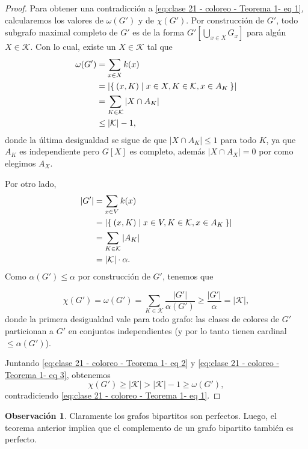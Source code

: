 \documentclass[12pt]{report}
\theoremstyle{plain}
\theoremstyle{definition}
\newtheorem{obs}[theorem]{Observación}
\newcommand{\abs}[1]{\left \vert #1 \right \vert}
\newcommand{\Kappa}{\mathcal{K}}
\begin{document}
\begin{proof}
Para obtener una contradicción a \eqref{eq:clase 21 - coloreo - Teorema 1- eq 1}, calcularemos los valores de $\omega (G')$ y de $\chi (G')$. Por construcción de $G'$, todo subgrafo maximal completo de $G'$ es de la forma $G'[\bigcup_{x \in X} G_x]$ para algún $X \in \Kappa$. Con lo cual, existe un $X \in \Kappa$ tal que
\begin{align}
\omega (G') &= \sum_{x \in X} k(x) \nonumber \\
            &= \abs{\Set{(x, K) |  x\in X, K \in \Kappa, x \in A_K}} \nonumber \\
            &= \sum_{K \in \Kappa} \abs{X \cap A_K} \nonumber \\
            &\leq \abs{\Kappa} -1 , \label{eq:clase 21 - coloreo - Teorema 1- eq 2}
\end{align}
donde la última desigualdad se sigue de que $\abs {X \cap A_K} \leq 1$ para todo $K$, ya que $A_K$ es independiente pero $G[X]$ es completo, además $\abs{X \cap A_X} = 0$ por como elegimos $A_X$.

Por otro lado,
\begin{align*}
\abs{G'} &= \sum_{x \in V} k(x) \\
        &= \abs{\Set{(x, K) | x \in V, K \in \Kappa, x \in A_K}} \\
        &= \sum_{K \in \Kappa} \abs{A_K} \\
        &= \abs{\Kappa} \cdot \alpha.
\end{align*}
Como $\alpha (G') \leq \alpha$ por construcción de $G'$, tenemos que

\begin{equation}\label{eq:clase 21 - coloreo - Teorema 1- eq 3}
\chi (G') = \omega (G') = \sum_{K \in \Kappa}  \frac{\abs{G'}}{\alpha (G')} \geq \frac{\abs {G'}}{\alpha} = \abs{\Kappa},
\end{equation}
donde la primera desigualdad vale para todo grafo: las clases de colores de $G'$ particionan a $G'$ en conjuntos independientes (y por lo tanto tienen cardinal $\leq \alpha (G')$).

Juntando \eqref{eq:clase 21 - coloreo - Teorema 1- eq 2} y \eqref{eq:clase 21 - coloreo - Teorema 1- eq 3}, obtenemos
\[
    \chi (G') \geq \abs{\Kappa} > \abs{\Kappa} - 1 \geq \omega (G'),
\]
contradiciendo \eqref{eq:clase 21 - coloreo - Teorema 1- eq 1}.
\end{proof}

\begin{obs}\label{obs:bipartitos son perfectos}
Claramente los grafos bipartitos son perfectos. Luego, el teorema anterior implica que el complemento de un grafo bipartito también es perfecto.
\end{obs}
\end{document}
